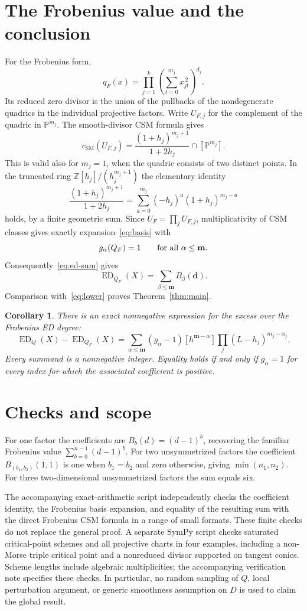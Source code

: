 \documentclass[11pt]{article}
\newtheorem{corollary}[theorem]{Corollary}
\theoremstyle{remark}\newtheorem{remark}[theorem]{Remark}
\newcommand{\PP}{\mathbb P}
\newcommand{\ED}{\operatorname{ED}}
\newcommand{\csm}{c_{\mathrm{SM}}}
\begin{document}
\section{The Frobenius value and the conclusion}
For the Frobenius form,
\[
 q_F(x)=\prod_{j=1}^k\left(\sum_{t=0}^{m_j}x_{jt}^{\,2}\right)^{d_j}.
\]
Its reduced zero divisor is the union of the pullbacks of the nondegenerate quadrics in the individual projective factors. Write $U_{F,j}$ for the complement of the quadric in $\PP^{m_j}$. The smooth-divisor CSM formula gives
\[
 \csm(U_{F,j})=
 \frac{(1+h_j)^{m_j+1}}{1+2h_j}\cap[\PP^{m_j}].
\]
This is valid also for $m_j=1$, when the quadric consists of two distinct points. In the truncated ring $\mathbb Z[h_j]/(h_j^{m_j+1})$ the elementary identity
\begin{equation}\label{eq:frob-basis}
 \frac{(1+h_j)^{m_j+1}}{1+2h_j}
 =\sum_{a=0}^{m_j}(-h_j)^a(1+h_j)^{m_j-a}
\end{equation}
holds, by a finite geometric sum. Since $U_F=\prod_jU_{F,j}$, multiplicativity of CSM classes gives exactly expansion~\eqref{eq:basis} with
\[
 g_\alpha(Q_F)=1\qquad\hbox{for all }\alpha\leq\mathbf m.
\]
Consequently~\eqref{eq:ed-sum} gives
\[
 \ED_{Q_F}(X)=\sum_{\beta\leq\mathbf m}B_\beta(\mathbf d).
\]
Comparison with~\eqref{eq:lower} proves Theorem~\ref{thm:main}.

\begin{corollary}\label{cor:gap}
There is an exact nonnegative expression for the excess over the Frobenius ED degree:
\[
 \ED_Q(X)-\ED_{Q_F}(X)=
 \sum_{\alpha\leq\mathbf m}(g_\alpha-1)
 [h^{\mathbf m-\alpha}]
 \prod_j(L-h_j)^{m_j-\alpha_j}.
\]
Every summand is a nonnegative integer. Equality holds if and only if $g_\alpha=1$ for every index for which the associated coefficient is positive.
\end{corollary}

\section{Checks and scope}
For one factor the coefficients are $B_b(d)=(d-1)^b$, recovering the familiar Frobenius value $\sum_{b=0}^{n-1}(d-1)^b$. For two unsymmetrized factors the coefficient $B_{(b_1,b_2)}(1,1)$ is one when $b_1=b_2$ and zero otherwise, giving $\min(n_1,n_2)$. For three two-dimensional unsymmetrized factors the sum equals six.

The accompanying exact-arithmetic script independently checks the coefficient identity, the Frobenius basis expansion, and equality of the resulting sum with the direct Frobenius CSM formula in a range of small formats. These finite checks do not replace the general proof. A separate SymPy script checks saturated critical-point schemes and all projective charts in four examples, including a non-Morse triple critical point and a nonreduced divisor supported on tangent conics. Scheme lengths include algebraic multiplicities; the accompanying verification note specifies these checks. In particular, no random sampling of $Q$, local perturbation argument, or generic smoothness assumption on $D$ is used to claim the global result.
\end{document}
